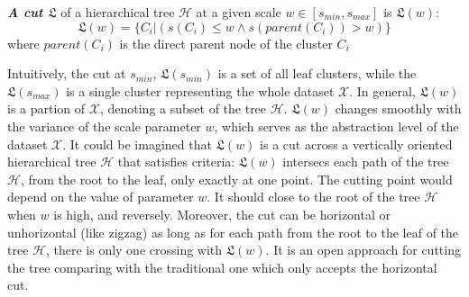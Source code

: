 \begin{definition}
\label{def:cut}
 \textbf{\textit{A cut $\mathfrak{L}$}} of a hierarchical tree $\mathcal{H}$ at a given scale $w \in [s_{min},s_{max}] $  is $\mathfrak{L}(w)$:
\begin{equation}
\label{equ:a_cut_l}
\mathfrak{L}(w) = \{C_i | (s(C_i) \leq w  \wedge s(parent(C_i)) > w)\}
\end{equation}
where $parent(C_i)$ is the direct parent node of the cluster $C_i$
\end{definition}
Intuitively, the cut at $s_{min}$, $\mathfrak{L}(s_{min})$ is a set of all leaf clusters, while the $\mathfrak{L}(s_{max})$ is a single cluster representing the whole dataset $\mathcal{X}$. In general, $\mathfrak{L}(w)$ is a partion of $\mathcal{X}$, denoting a subset of the tree $\mathcal{H}$. $\mathfrak{L}(w)$ changes smoothly with the variance of the scale parameter $w$, which serves as the abstraction level of the dataset $\mathcal{X}$. It could be imagined that $\mathfrak{L}(w)$ is a cut across a vertically oriented hierarchical tree $\mathcal{H}$ that satisfies criteria: $\mathfrak{L}(w)$ intersecs each path of the tree $\mathcal{H}$, from the root to the leaf, only exactly at one point. The cutting point would depend on the value of parameter $w$. It should close to the root of the tree $\mathcal{H}$ when $w$ is high, and reversely. Moreover, the cut can be horizontal or unhorizontal (like zigzag) as long as for each path from the root to the leaf of the tree $\mathcal{H}$, there is only one crossing with $\mathfrak{L}(w)$. It is an open approach for cutting the tree comparing with the traditional one which only accepts the horizontal cut. 

